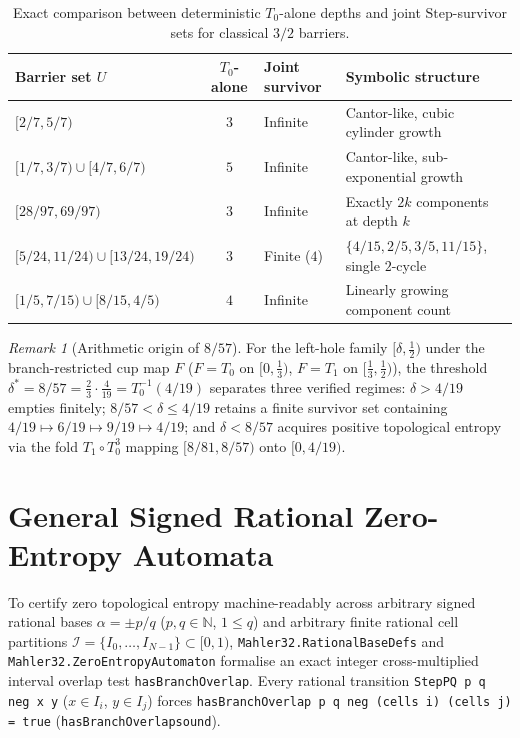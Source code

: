 \documentclass[11pt,a4paper]{article}
\theoremstyle{remark}
\newtheorem{remark}[theorem]{Remark}
\newcommand{\N}{\mathbb{N}}
\renewcommand{\_}{\textunderscore\allowbreak}
\newcommand{\lean}[1]{\texttt{#1}}
\begin{document}
\begin{table}[htbp]
\centering
\small
\begin{tabularx}{\textwidth}{@{}L{0.31\textwidth} c L{0.13\textwidth} Y@{}}
\toprule
Barrier set $U$ & $T_0$-alone & Joint survivor & Symbolic structure \\
\midrule
$[2/7,5/7)$ & $3$ & Infinite & Cantor-like, cubic cylinder growth \\
$[1/7,3/7)\cup[4/7,6/7)$ & $5$ & Infinite & Cantor-like, sub-exponential growth \\
$[28/97,69/97)$ & $3$ & Infinite & Exactly $2k$ components at depth $k$ \\
$[5/24,11/24)\cup[13/24,19/24)$ & $3$ & Finite ($4$) & $\{4/15,2/5,3/5,11/15\}$, single $2$-cycle \\
$[1/5,7/15)\cup[8/15,4/5)$ & $4$ & Infinite & Linearly growing component count \\
\bottomrule
\end{tabularx}
\caption{Exact comparison between deterministic $T_0$-alone depths and joint $\mathrm{Step}$-survivor sets for classical $3/2$ barriers.}
\label{tab:barriers}
\end{table}

\begin{remark}[Arithmetic origin of $8/57$]
\label{rem:857}
For the left-hole family $[\delta,\tfrac12)$ under the branch-restricted cup map $F$ ($F=T_0$ on $[0,\tfrac13)$, $F=T_1$ on $[\tfrac13,\tfrac12)$), the threshold $\delta^\ast=8/57=\tfrac23\cdot\tfrac{4}{19}=T_0^{-1}(4/19)$ separates three verified regimes: $\delta>4/19$ empties finitely; $8/57<\delta\le 4/19$ retains a finite survivor set containing $4/19\mapsto 6/19\mapsto 9/19\mapsto 4/19$; and $\delta<8/57$ acquires positive topological entropy via the fold $T_1\circ T_0^3$ mapping $[8/81,8/57)$ onto $[0,4/19)$.
\end{remark}

\section{General Signed Rational Zero-Entropy Automata}
\label{sec:automaton}

To certify zero topological entropy machine-readably across arbitrary signed rational bases $\alpha=\pm p/q$ ($p,q\in\N$, $1\le q$) and arbitrary finite rational cell partitions $\mathcal{I}=\{I_0,\dots,I_{N-1}\}\subset[0,1)$, \lean{Mahler32.\allowbreak RationalBaseDefs} and \lean{Mahler32.\allowbreak ZeroEntropyAutomaton} formalise an exact integer cross-multiplied interval overlap test \lean{hasBranchOverlap}. Every rational transition \lean{StepPQ p q neg x y} ($x\in I_i$, $y\in I_j$) forces \lean{hasBranchOverlap p q neg (cells i) (cells j) = true} (\lean{hasBranchOverlap\_sound}).
\end{document}
